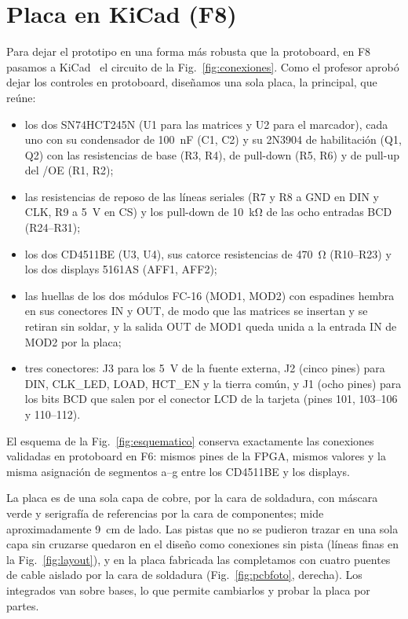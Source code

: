 \documentclass[conference,a4paper]{IEEEtran}
\begin{document}
\section{Placa en KiCad (F8)}
\label{sec:pcb}

Para dejar el prototipo en una forma más robusta que la protoboard, en F8 pasamos a KiCad~\cite{kicad} el circuito de la Fig.~\ref{fig:conexiones}. Como el profesor aprobó dejar los controles en protoboard, diseñamos una sola placa, la principal, que reúne:
\begin{itemize}
\item los dos SN74HCT245N (U1 para las matrices y U2 para el marcador), cada uno con su condensador de 100~nF (C1, C2) y su 2N3904 de habilitación (Q1, Q2) con las resistencias de base (R3, R4), de pull-down (R5, R6) y de pull-up del /OE (R1, R2);
\item las resistencias de reposo de las líneas seriales (R7 y R8 a GND en DIN y CLK, R9 a 5~V en CS) y los pull-down de 10~kΩ de las ocho entradas BCD (R24--R31);
\item los dos CD4511BE (U3, U4), sus catorce resistencias de 470~Ω (R10--R23) y los dos displays 5161AS (AFF1, AFF2);
\item las huellas de los dos módulos FC-16 (MOD1, MOD2) con espadines hembra en sus conectores IN y OUT, de modo que las matrices se insertan y se retiran sin soldar, y la salida OUT de MOD1 queda unida a la entrada IN de MOD2 por la placa;
\item tres conectores: J3 para los 5~V de la fuente externa, J2 (cinco pines) para DIN, CLK\_LED, LOAD, HCT\_EN y la tierra común, y J1 (ocho pines) para los bits BCD que salen por el conector LCD de la tarjeta (pines 101, 103--106 y 110--112).
\end{itemize}
El esquema de la Fig.~\ref{fig:esquematico} conserva exactamente las conexiones validadas en protoboard en F6: mismos pines de la FPGA, mismos valores y la misma asignación de segmentos a--g entre los CD4511BE y los displays.

La placa es de una sola capa de cobre, por la cara de soldadura, con máscara verde y serigrafía de referencias por la cara de componentes; mide aproximadamente 9~cm de lado. Las pistas que no se pudieron trazar en una sola capa sin cruzarse quedaron en el diseño como conexiones sin pista (líneas finas en la Fig.~\ref{fig:layout}), y en la placa fabricada las completamos con cuatro puentes de cable aislado por la cara de soldadura (Fig.~\ref{fig:pcbfoto}, derecha). Los integrados van sobre bases, lo que permite cambiarlos y probar la placa por partes.
\end{document}
